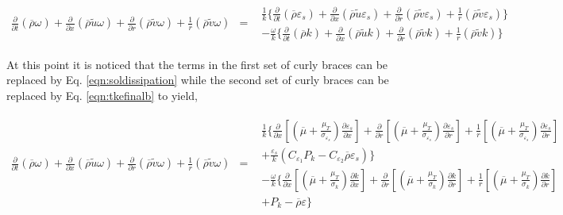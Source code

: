 \begin{displaymath}
	\begin{array}{ccc}
	 \frac{\partial}{\partial t}(\overline{\rho}\omega)
	+ \frac{\partial}{\partial x}(\overline{\rho}\tilde u\omega)+ \frac{\partial}{\partial r}(\overline{\rho}\tilde v\omega)
	+ \frac{1}{r}(\overline{\rho}\tilde v\omega) & = &
	   \begin{array}{c}
		\frac{1}{k}\Big\{\frac{\partial}{\partial t}(\overline{\rho}\varepsilon_s)
		+ \frac{\partial}{\partial x}(\overline{\rho}\tilde u\varepsilon_s)
		+ \frac{\partial}{\partial r}(\overline{\rho}\tilde v\varepsilon_s)
		+ \frac{1}{r}(\overline{\rho}\tilde v\varepsilon_s)\Big\} \\
		- \frac{\omega}{k}\Big\{ \frac{\partial}{\partial t}(\overline{\rho}k)
		+ \frac{\partial}{\partial x}(\overline{\rho}\tilde u k)+ \frac{\partial}{\partial r}(\overline{\rho}\tilde v k)
		+ \frac{1}{r}(\overline{\rho}\tilde v k)\Big\}
	   \end{array}
	\end{array}
\end{displaymath}

	At this point it is noticed that the terms in the first set of curly braces can be replaced by 
Eq. \ref{eqn:soldissipation} while the second set of curly braces can be replaced by Eq. \ref{eqn:tkefinalb} to yield,

\begin{displaymath}
	\begin{array}{ccc}
	 \frac{\partial}{\partial t}(\overline{\rho}\omega)
	+ \frac{\partial}{\partial x}(\overline{\rho}\tilde u\omega)+ \frac{\partial}{\partial r}(\overline{\rho}\tilde v\omega)
	+ \frac{1}{r}(\overline{\rho}\tilde v\omega) & = &
	   \begin{array}{c}
		\frac{1}{k}\Big\{\frac{\partial}{\partial x}[(\overline{\mu} + \frac{\mu_T}{\sigma_{\varepsilon_s}})
		\frac{\partial \varepsilon_s}{\partial x}] 
		+ \frac{\partial}{\partial r}[(\overline{\mu} + \frac{\mu_T}{\sigma_{\varepsilon_s}})
		\frac{\partial \varepsilon_s}{\partial r}]
		+ \frac{1}{r}[(\overline{\mu} + \frac{\mu_T}{\sigma_{\varepsilon_s}})
		\frac{\partial \varepsilon_s}{\partial r}] \\ 
		+ \frac{\varepsilon_s}{k}(C_{\varepsilon_1}P_k - C_{\varepsilon_2}\overline{\rho}\varepsilon_s)\Big\} \\
		- \frac{\omega}{k}\Big\{\frac{\partial}{\partial x}[(\overline{\mu} + \frac{\mu_T}{\sigma_k})
		\frac{\partial k}{\partial x}] 
		+ \frac{\partial}{\partial r}[(\overline{\mu} + \frac{\mu_T}{\sigma_k})
		\frac{\partial k}{\partial r}]
		+ \frac{1}{r}[(\overline{\mu} + \frac{\mu_T}{\sigma_k})
		\frac{\partial k}{\partial r}] \\
		+ P_k - \overline{\rho}\varepsilon \Big\}
	   \end{array}
	\end{array}
\end{displaymath}

